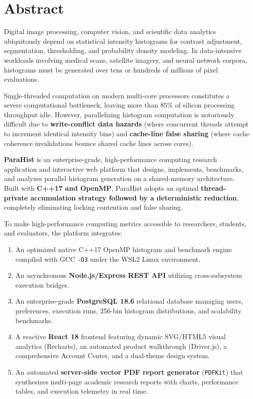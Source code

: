 \documentclass[12pt,a4paper,oneside]{report}
\begin{document}

\chapter*{Abstract}
Digital image processing, computer vision, and scientific data analytics ubiquitously depend on statistical intensity histograms for contrast adjustment, segmentation, thresholding, and probability density modeling. In data-intensive workloads involving medical scans, satellite imagery, and neural network corpora, histograms must be generated over tens or hundreds of millions of pixel evaluations.

Single-threaded computation on modern multi-core processors constitutes a severe computational bottleneck, leaving more than $85\%$ of silicon processing throughput idle. However, parallelizing histogram computation is notoriously difficult due to \textbf{write-conflict data hazards} (where concurrent threads attempt to increment identical intensity bins) and \textbf{cache-line false sharing} (where cache coherence invalidations bounce shared cache lines across cores).

\textbf{ParaHist} is an enterprise-grade, high-performance computing research application and interactive web platform that designs, implements, benchmarks, and analyzes parallel histogram generation on a shared-memory architecture. Built with \textbf{C++17 and OpenMP}, ParaHist adopts an optimal \textbf{thread-private accumulation strategy followed by a deterministic reduction}, completely eliminating locking contention and false sharing.

To make high-performance computing metrics accessible to researchers, students, and evaluators, the platform integrates:
\begin{enumerate}
    \item An optimized native C++17 OpenMP histogram and benchmark engine compiled with GCC \texttt{-O3} under the WSL2 Linux environment.
    \item An asynchronous \textbf{Node.js/Express REST API} utilizing cross-subsystem execution bridges.
    \item An enterprise-grade \textbf{PostgreSQL 18.6} relational database managing users, preferences, execution runs, 256-bin histogram distributions, and scalability benchmarks.
    \item A reactive \textbf{React 18} frontend featuring dynamic SVG/HTML5 visual analytics (Recharts), an automated product walkthrough (Driver.js), a comprehensive Account Center, and a dual-theme design system.
    \item An automated \textbf{server-side vector PDF report generator} (\texttt{PDFKit}) that synthesizes multi-page academic research reports with charts, performance tables, and execution telemetry in real time.
\end{enumerate}
\end{document}

